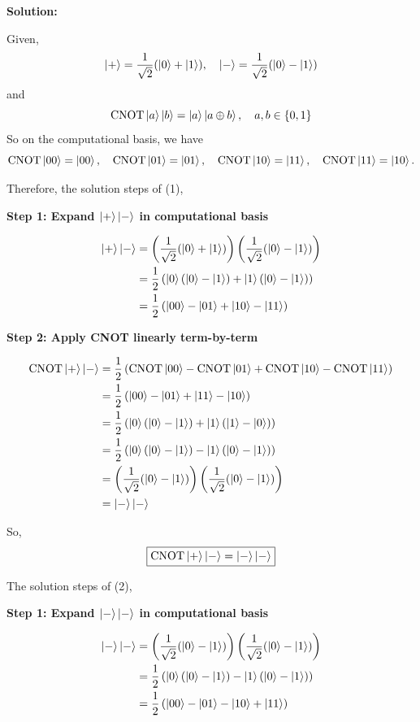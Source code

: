 \documentclass[11pt]{article}
\newenvironment{solution}
{\par\noindent\textbf{Solution:}\par}
{\vspace{1em}}
\begin{document}
\begin{solution}

Given, \[\ket{+} = \frac{1}{\sqrt{2}}(\ket{0} + \ket{1}), \quad \ket{-} = \frac{1}{\sqrt{2}}(\ket{0} - \ket{1})\]
and \[\operatorname{CNOT}\ket{a}\ket{b} = \ket{a}\ket{a \oplus b}, \quad a,b \in \{0,1\}\]
So on the computational basis, we have
\[\operatorname{CNOT}\ket{00} = \ket{00}, \quad \operatorname{CNOT}\ket{01} = \ket{01}, \quad \operatorname{CNOT}\ket{10} = \ket{11}, \quad \operatorname{CNOT}\ket{11} = \ket{10}.\]

Therefore, the solution steps of (1),

\textbf{Step 1: Expand $\ket{+}\ket{-}$ in computational basis}

\[\begin{aligned}
\ket{+}\ket{-} &= \left(\frac{1}{\sqrt{2}}(\ket{0} +\ket{1})\right)\left(\frac{1}{\sqrt{2}}(\ket{0} - \ket{1})\right) \\
&= \frac{1}{2}\left(\ket{0}(\ket{0} - \ket{1}) + \ket{1}(\ket{0} - \ket{1})\right) \\
&= \frac{1}{2}\left(\ket{00} - \ket{01} + \ket{10} - \ket{11}\right)
\end{aligned}\]

\textbf{Step 2: Apply CNOT linearly term-by-term}

\[\begin{aligned}
\operatorname{CNOT}\ket{+}\ket{-} &= \frac{1}{2}\left(\operatorname{CNOT}\ket{00} - \operatorname{CNOT}\ket{01} + \operatorname{CNOT}\ket{10} - \operatorname{CNOT}\ket{11}\right) \\
&= \frac{1}{2}\left(\ket{00} - \ket{01} + \ket{11} - \ket{10}\right) \\
&= \frac{1}{2}\left(\ket{0}(\ket{0} - \ket{1}) + \ket{1}(\ket{1} - \ket{0})\right) \\
&= \frac{1}{2}\left(\ket{0}(\ket{0} - \ket{1}) - \ket{1}(\ket{0} - \ket{1})\right) \\
&= \left(\frac{1}{\sqrt{2}}(\ket{0} - \ket{1})\right)\left(\frac{1}{\sqrt{2}}(\ket{0} - \ket{1})\right) \\
&= \ket{-}\ket{-}
\end{aligned}\]

So, \[\boxed{\operatorname{CNOT}\ket{+}\ket{-} = \ket{-}\ket{-}}\]

The solution steps of (2),

\textbf{Step 1: Expand $\ket{-}\ket{-}$ in computational basis}

\[\begin{aligned}
\ket{-}\ket{-} &= \left(\frac{1}{\sqrt{2}}(\ket{0} - \ket{1})\right)\left(\frac{1}{\sqrt{2}}(\ket{0} - \ket{1})\right) \\
&= \frac{1}{2}\left(\ket{0}(\ket{0} - \ket{1}) - \ket{1}(\ket{0} - \ket{1})\right) \\
&= \frac{1}{2}\left(\ket{00} - \ket{01} - \ket{10} + \ket{11}\right)
\end{aligned}\]


\end{solution}
\end{document}
